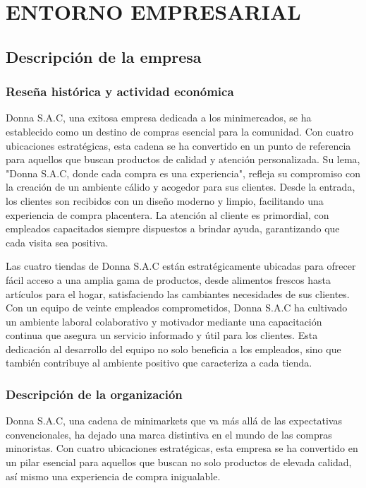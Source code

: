 \chapter{ENTORNO EMPRESARIAL}

\section{Descripción de la empresa}
\subsection{Reseña histórica y actividad económica}
Donna S.A.C, una exitosa empresa dedicada a los minimercados, se ha establecido como un destino de compras esencial para la comunidad. Con cuatro ubicaciones estratégicas, esta cadena se ha convertido en un punto de referencia para aquellos que buscan productos de calidad y atención personalizada. Su lema, "Donna S.A.C, donde cada compra es una experiencia", refleja su compromiso con la creación de un ambiente cálido y acogedor para sus clientes. Desde la entrada, los clientes son recibidos con un diseño moderno y limpio, facilitando una experiencia de compra placentera. La atención al cliente es primordial, con empleados capacitados siempre dispuestos a brindar ayuda, garantizando que cada visita sea positiva.
\newline

Las cuatro tiendas de Donna S.A.C están estratégicamente ubicadas para ofrecer fácil acceso a una amplia gama de productos, desde alimentos frescos hasta artículos para el hogar, satisfaciendo las cambiantes necesidades de sus clientes. Con un equipo de veinte empleados comprometidos, Donna S.A.C ha cultivado un ambiente laboral colaborativo y motivador mediante una capacitación continua que asegura un servicio informado y útil para los clientes. Esta dedicación al desarrollo del equipo no solo beneficia a los empleados, sino que también contribuye al ambiente positivo que caracteriza a cada tienda.

\subsection{Descripción de la organización}


Donna S.A.C, una cadena de minimarkets que va más allá de las expectativas convencionales, ha dejado una marca distintiva en el mundo de las compras minoristas. Con cuatro ubicaciones estratégicas, esta empresa se ha convertido en un pilar esencial para aquellos que buscan no solo productos de elevada calidad, así mismo una experiencia de compra inigualable.
\newline

